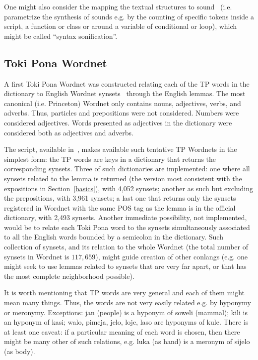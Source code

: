 One might also 
consider the mapping the textual structures
to sound~\cite{mass} (i.e. parametrize the synthesis of sounds e.g. 
by the counting of specific tokens inside a script, a function or
class or around a variable of conditional or
loop), which might be called ``syntax sonification''.

\subsection{Toki Pona Wordnet}\label{wn}
A first Toki Pona Wordnet was constructed
relating each of the TP words in the dictionary
to English Wordnet synsets~\cite{wordnet}
through the English lemmas.
The most canonical (i.e. Princeton) Wordnet only contains nouns,
adjectives, verbs, and adverbs.
Thus, particles and prepositions were not considered.
Numbers were considered adjectives.
Words presented as adjectives in the dictionary
were considered both as adjectives and adverbs.~\cite{wordnet}

The  script, available in~\cite{tokipona},
makes available such tentative TP Wordnets in the simplest form:
the TP words are keys in a dictionary that returns the
corresponding synsets.
Three of such dictionaries are implemented:
one where all synsets related to the lemma is
returned (the version most consistent
with the expositions in Section~\ref{basics}),
with 4,052 synsets;
another as such but excluding the prepositions,
with 3,961 synsets;
a last one that returns only the synsets
registered in Wordnet with the same POS tag as the lemma
is in the official dictionary,
with 2,493 synsets. 
Another immediate possibility, not implemented,
would be to relate each Toki Pona word to the synsets
simultaneously associated to all the English
words bounded by a semicolon in the dictionary.
Such collection of synsets, and its relation to the whole
Wordnet
(the total number of synsets in Wordnet is $117,659$),
might guide creation of other conlangs
(e.g. one might seek to use lemmas related to synsets that
are very far apart, or that has the most complete neighborhood
possible).

It is worth mentioning that TP words are very general
and each of them might mean many things.
Thus, the words are not very easily related e.g. by hyponymy
or meronymy.
Exceptions: jan (people) is a hyponym of soweli (mammal);
kili is an hyponym of kasi;
walo, pimeja, jelo, loje, laso
are hyponyms of kule.
There is at least one caveat:
if a particular meaning of each word is chosen,
then there might be many other of such relations,
e.g. 
luka (as hand) is a meronym of sijelo (as body).

